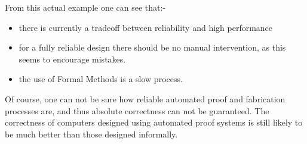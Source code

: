 From this actual example one can see that:-
\begin{itemize}
\item there is currently a tradeoff between reliability and high performance
\item for a fully reliable design there should be no manual intervention, as this seems to encourage  mistakes.
\item the use of Formal Methods is a slow process.
\end{itemize}

Of course, one  can not be sure how reliable  automated proof and fabrication processes are, and thus absolute correctness can not be guaranteed. 
The correctness of computers designed using automated proof systems is still likely to be much better than those designed informally.





